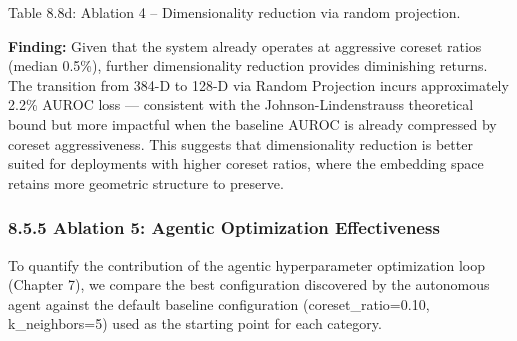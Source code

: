 Table 8.8d: Ablation 4 -- Dimensionality reduction via random projection.

\textbf{Finding:} Given that the system already operates at aggressive coreset ratios (median 0.5\%), further dimensionality reduction provides diminishing returns. The transition from 384-D to 128-D via Random Projection incurs approximately 2.2\% AUROC loss --- consistent with the Johnson-Lindenstrauss theoretical bound but more impactful when the baseline AUROC is already compressed by coreset aggressiveness. This suggests that dimensionality reduction is better suited for deployments with higher coreset ratios, where the embedding space retains more geometric structure to preserve.

\subsubsection{8.5.5 Ablation 5: Agentic Optimization Effectiveness}\label{ablation-5-agentic-optimization-effectiveness}

To quantify the contribution of the agentic hyperparameter optimization loop (Chapter 7), we compare the best configuration discovered by the autonomous agent against the default baseline configuration (coreset\_ratio=0.10, k\_neighbors=5) used as the starting point for each category.

